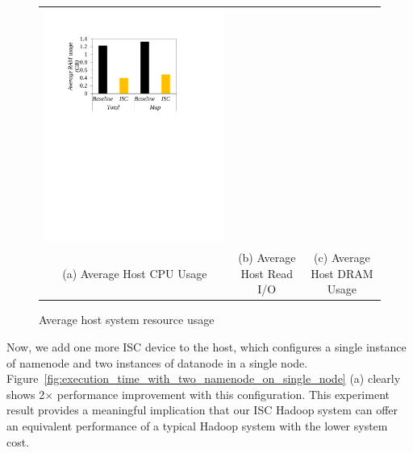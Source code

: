 \begin{figure}[t]
\begin{tabular}{ccc}
  \includegraphics[width=0.66\columnwidth]{figures/Hadoop_average_RAM_usage.pdf}\\	
  (a) Average Host CPU Usage & (b) Average Host Read I/O & (c) Average Host DRAM Usage
\end{tabular}
  \caption{Average host system resource usage}
  \label{fig:avg_host_resource_usage}
\end{figure}





Now, we add one more ISC device to the host, which configures a single instance of namenode and two instances of datanode in a single node. Figure~\ref{fig:execution_time_with_two_namenode_on_single_node} (a) clearly shows 2$\times$ performance improvement with this configuration. This experiment result provides a meaningful implication that our ISC Hadoop system can offer an equivalent performance of a typical Hadoop system with the lower system cost.






